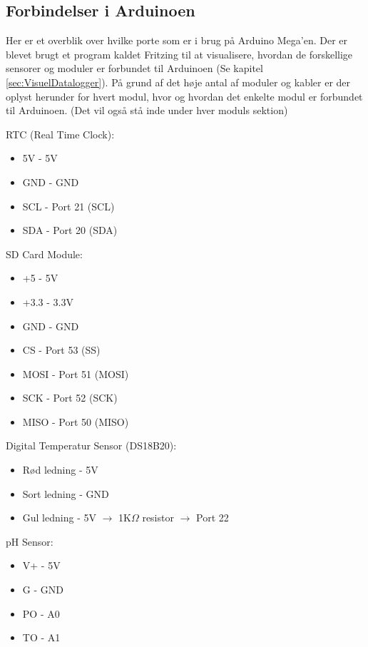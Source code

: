 	\subsection{Forbindelser i Arduinoen}
		Her er et overblik over hvilke porte som er i brug på Arduino Mega'en. Der er blevet brugt et program kaldet Fritzing til at visualisere, hvordan de forskellige sensorer og moduler er forbundet til Arduinoen (Se kapitel \ref{sec:VisuelDatalogger}). På grund af det høje antal af moduler og kabler er der oplyst herunder for hvert modul, hvor og hvordan det enkelte modul er forbundet til Arduinoen. (Det vil også stå inde under hver moduls sektion)\\ [7pt]
		\begin{minipage}{0.49\textwidth}
			RTC (Real Time Clock):
			\begin{itemize}
				\item 5V - 5V
				\item GND - GND
				\item SCL - Port 21 (SCL)
				\item SDA - Port 20 (SDA)
			\end{itemize}
			SD Card Module:
			\begin{itemize}
				\item +5 - 5V
				\item +3.3 - 3.3V
				\item GND - GND
				\item CS - Port 53 (SS)
				\item MOSI - Port 51 (MOSI)
				\item SCK - Port 52 (SCK)
				\item MISO - Port 50 (MISO)
			\end{itemize}
		\end{minipage}
		\hfill
		\begin{minipage}{0.49\textwidth}
			Digital Temperatur Sensor (DS18B20):
			\begin{itemize}
				\item Rød ledning - 5V
				\item Sort ledning - GND
				\item Gul ledning - 5V $\to$ 1K$\Omega$ resistor $\to$ Port 22
			\end{itemize}
			pH Sensor:
			\begin{itemize}
				\item V+ - 5V
				\item G - GND
				\item PO - A0
				\item TO - A1
			\end{itemize}
		\end{minipage}
